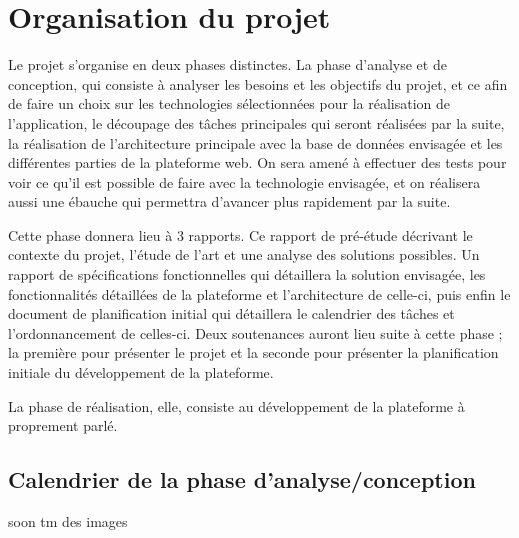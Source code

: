 \section{Organisation du projet}
\label{sec:organisation}
    Le projet s’organise en deux phases distinctes. La phase d’analyse et de conception, qui consiste
    à analyser les besoins et les objectifs du projet, et ce afin de faire un choix sur les technologies
    sélectionnées pour la réalisation de l’application, le découpage des tâches principales qui seront
    réalisées par la suite, la réalisation de l’architecture principale avec la base de données envisagée
    et les différentes parties de la plateforme web. On sera amené à effectuer des tests pour voir ce qu’il
    est possible de faire avec la technologie envisagée, et on réalisera aussi une ébauche qui permettra
    d’avancer plus rapidement par la suite.

    Cette phase donnera lieu à 3 rapports. Ce rapport de pré-étude décrivant le contexte du projet,
    l’étude de l’art et une analyse des solutions possibles. Un rapport de spécifications fonctionnelles
    qui détaillera la solution envisagée, les fonctionnalités détaillées de la plateforme et l’architecture
    de celle-ci, puis enfin le document de planification initial qui détaillera le calendrier des tâches et
    l’ordonnancement de celles-ci. Deux soutenances auront lieu suite à cette phase ; la première pour présenter
    le projet et la seconde pour présenter la planification initiale du développement de la plateforme.

    La phase de réalisation, elle, consiste au développement de la plateforme à proprement parlé.

    \subsection{Calendrier de la phase d’analyse/conception}
    \label{subsec:calendrier}

    soon tm des images
